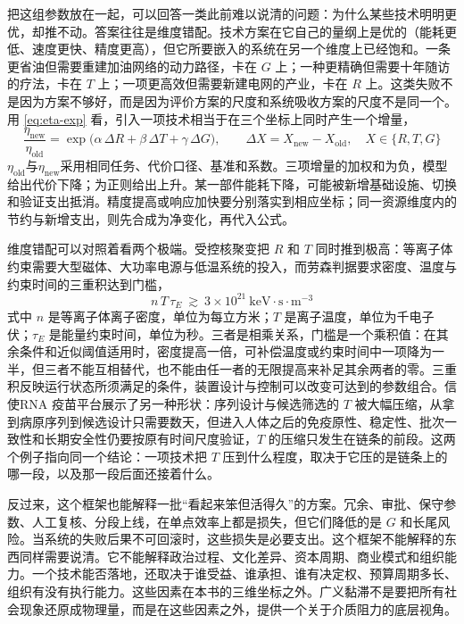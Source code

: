 
把这组参数放在一起，可以回答一类此前难以说清的问题：为什么某些技术明明更优，却推不动。答案往往是维度错配。技术方案在它自己的量纲上是优的（能耗更低、速度更快、精度更高），但它所要嵌入的系统在另一个维度上已经饱和。一条更省油但需要重建加油网络的动力路径，卡在 $G$ 上；一种更精确但需要十年随访的疗法，卡在 $T$ 上；一项更高效但需要新建电网的产业，卡在 $R$ 上。这类失败不是因为方案不够好，而是因为评价方案的尺度和系统吸收方案的尺度不是同一个。用 \eqref{eq:eta-exp} 看，引入一项技术相当于在三个坐标上同时产生一个增量，
\begin{equation}
\frac{\eta_{\mathrm{new}}}{\eta_{\mathrm{old}}}
=\exp\bigl(\alpha\,\Delta R+\beta\,\Delta T+\gamma\,\Delta G\bigr),
\qquad
\Delta X=X_{\mathrm{new}}-X_{\mathrm{old}},\quad X\in\{R,T,G\}
\label{eq:mismatch}
\end{equation}
$\eta_{\mathrm{old}}$与$\eta_{\mathrm{new}}$采用相同任务、代价口径、基准和系数。三项增量的加权和为负，模型给出代价下降；为正则给出上升。某一部件能耗下降，可能被新增基础设施、切换和验证支出抵消。精度提高或响应加快要分别落实到相应坐标；同一资源维度内的节约与新增支出，则先合成为净变化，再代入公式。

维度错配可以对照着看两个极端。受控核聚变把 $R$ 和 $T$ 同时推到极高：等离子体约束需要大型磁体、大功率电源与低温系统的投入，而劳森判据要求密度、温度与约束时间的三重积达到门槛，
\begin{equation}
n\,T\,\tau_{E}\ \gtrsim\ 3\times10^{21}\ \mathrm{keV\cdot s\cdot m^{-3}}
\label{eq:lawson}
\end{equation}
式中 $n$ 是等离子体离子密度，单位为每立方米；$T$ 是离子温度，单位为千电子伏；$\tau_{E}$ 是能量约束时间，单位为秒。三者是相乘关系，门槛是一个乘积值：在其余条件和近似阈值适用时，密度提高一倍，可补偿温度或约束时间中一项降为一半，但三者不能互相替代，也不能由任一者的无限提高来补足其余两者的零。三重积反映运行状态所须满足的条件，装置设计与控制可以改变可达到的参数组合\cite{lawson1957some}。信使RNA 疫苗平台展示了另一种形状：序列设计与候选筛选的 $T$ 被大幅压缩，从拿到病原序列到候选设计只需要数天，但进入人体之后的免疫原性、稳定性、批次一致性和长期安全性仍要按原有时间尺度验证，$T$ 的压缩只发生在链条的前段。这两个例子指向同一个结论：一项技术把 $T$ 压到什么程度，取决于它压的是链条上的哪一段，以及那一段后面还接着什么。

反过来，这个框架也能解释一批“看起来笨但活得久”的方案。冗余、审批、保守参数、人工复核、分段上线，在单点效率上都是损失，但它们降低的是 $G$ 和长尾风险。当系统的失败后果不可回滚时，这些损失是必要支出。这个框架不能解释的东西同样需要说清。它不能解释政治过程、文化差异、资本周期、商业模式和组织能力。一个技术能否落地，还取决于谁受益、谁承担、谁有决定权、预算周期多长、组织有没有执行能力。这些因素在本书的三维坐标之外。广义黏滞不是要把所有社会现象还原成物理量，而是在这些因素之外，提供一个关于介质阻力的底层视角。

